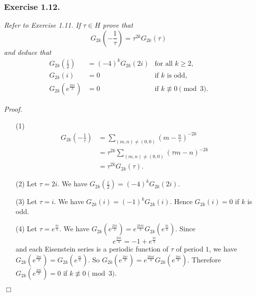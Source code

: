 \documentclass{article}
\begin{document}
\subsubsection*{Exercise 1.12.}
\emph{Refer to Exercise 1.11. If $\tau \in H$ prove that
\[
  G_{2k}\left(-\frac{1}{\tau}\right) = \tau^{2k} G_{2k}(\tau)
\]
and deduce that
\begin{align*}
  G_{2k}\left(\frac{i}{2}\right) &= (-4)^k G_{2k}(2i)
    &\text{for all $k \geq 2$}, \\
  G_{2k}(i) &= 0
    &\text{if $k$ is odd}, \\
  G_{2k}(e^{\frac{2\pi i}{3}}) &= 0
    &\text{if $k \not\equiv 0 \pmod{3}$}.
\end{align*}}



\emph{Proof.}
\begin{enumerate}
\item[(1)]
  \begin{align*}
    G_{2k}\left(-\frac{1}{\tau}\right)
    &= \sum_{(m,n) \neq (0,0)} \left(m - \frac{n}{\tau}\right)^{-2k} \\
    &= \tau^{2k} \sum_{(m,n) \neq (0,0)} (\tau m - n)^{-2k} \\
    &= \tau^{2k} G_{2k}(\tau).
  \end{align*}

\item[(2)]
  Let $\tau = 2i$.
  We have $G_{2k}\left(\frac{i}{2}\right) = (-4)^k G_{2k}(2i)$.

\item[(3)]
  Let $\tau = i$.
  We have $G_{2k}(i) = (-1)^k G_{2k}(i)$.
  Hence $G_{2k}(i) = 0$ if $k$ is odd.

\item[(4)]
  Let $\tau = e^{\frac{\pi i}{3}}$.
  We have $G_{2k}(e^{\frac{2\pi i}{3}}) = e^{\frac{2k \pi i}{3}} G_{2k}(e^{\frac{\pi i}{3}})$.
  Since
  \[
    e^{\frac{2\pi i}{3}} = -1 + e^{\frac{\pi i}{3}}
  \]
  and each Eisenstein series is a periodic function of $\tau$ of period $1$,
  we have $G_{2k}(e^{\frac{2\pi i}{3}}) = G_{2k}(e^{\frac{\pi i}{3}})$.
  So $G_{2k}(e^{\frac{2\pi i}{3}}) = e^{\frac{2k \pi i}{3}} G_{2k}(e^{\frac{2\pi i}{3}})$.
  Therefore $G_{2k}(e^{\frac{2\pi i}{3}}) = 0$ if $k \not\equiv 0 \pmod{3}$.
\end{enumerate}
$\Box$ \\\\



\end{document}
